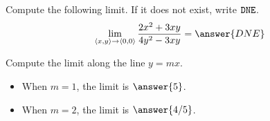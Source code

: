 \documentclass{ximera}
\author{Jim Talamo \and Bart Snapp}
\begin{document}
\begin{exercise}
  Compute the following limit. If it does not exist, write $\verb|DNE|$.
  \[
  \lim_{\vector{x,y}\to \vector{0,0}}\frac{2x^2+3 x y}{4y^2-3xy} = \answer{DNE}
  \]
  \begin{exercise}
    Compute the limit along the line $y = m x$.
    \begin{itemize}
    \item When $m = 1$, the limit is $\answer{5}$.
    \item When $m = 2$, the limit is $\answer{4/5}$.
    \end{itemize}
  \end{exercise}
\end{exercise}
\end{document}
